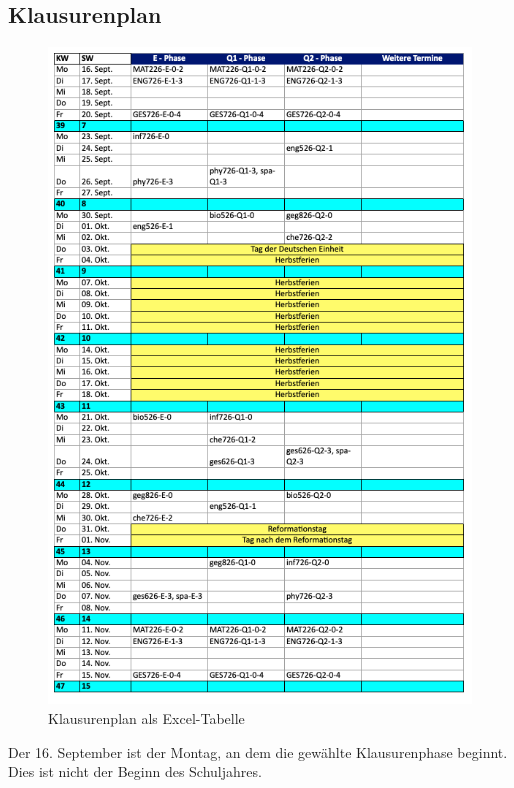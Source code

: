 \newpage
\subsection{Klausurenplan}
\begin{figure}[H]
    \centering
    \includegraphics[width=0.8\linewidth]{docs/graphics/Klausurenplan.png}
    \caption{Klausurenplan als Excel-Tabelle}
    \label{fig:klausurenplan}
\end{figure}
Der 16. September ist der Montag, an dem die gewählte Klausurenphase beginnt. Dies ist nicht der Beginn des Schuljahres.